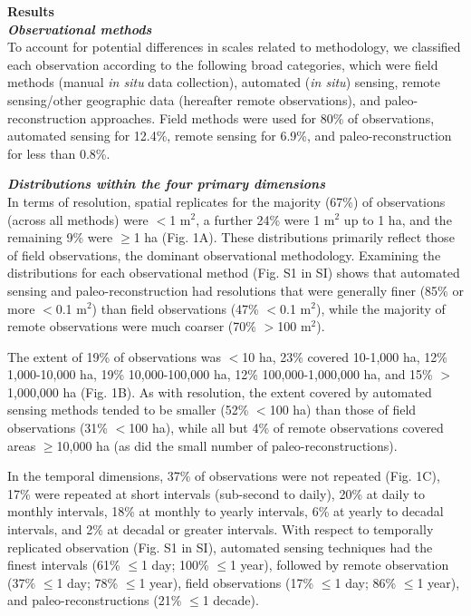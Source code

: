 \documentclass[12pt]{article}
\begin{document}
\noindent \textbf{Results}\\
\noindent \textbf{\emph{Observational methods}}\\
To account for potential differences in scales related to methodology, we classified each observation according to the following broad categories, which were field methods (manual \emph{in situ} data collection), automated (\emph{in situ}) sensing, remote sensing/other geographic data (hereafter remote observations), and paleo-reconstruction approaches. Field methods were used for 80\% of observations, automated sensing for 12.4\%, remote sensing for 6.9\%, and paleo-reconstruction for less than 0.8\%. 

\noindent \textbf{\emph{Distributions within the four primary dimensions}}\\
In terms of resolution, spatial replicates for the majority (67\%) of observations (across all methods) were $<$1 m$^2$, a further 24\% were 1 m$^2$ up to 1 ha, and the remaining 9\% were $\geq$1 ha (Fig. 1A). These distributions primarily reflect those of field observations, the dominant observational methodology. Examining the distributions for each observational method (Fig. S1 in SI) shows that automated sensing and paleo-reconstruction had resolutions that were generally finer (85\% or more $<$0.1 m$^2$) than field observations (47\% $<$0.1 m$^2$), while the majority of remote observations were much coarser (70\% $>$100 m$^2$).   

The extent of 19\% of observations was $<$10 ha, 23\% covered 10-1,000 ha, 12\% 1,000-10,000 ha, 19\% 10,000-100,000 ha, 12\% 100,000-1,000,000 ha, and 15\% $>$1,000,000 ha (Fig. 1B).  As with resolution, the extent covered by automated sensing methods tended to be smaller (52\% $<$100 ha) than those of field observations (31\% $<$100 ha), while all but 4\% of remote observations covered areas $\geq$10,000 ha (as did the small number of paleo-reconstructions).  


In the temporal dimensions, 37\% of observations were not repeated (Fig. 1C), 17\% were repeated at short intervals (sub-second to daily), 20\% at daily to monthly intervals, 18\% at monthly to yearly intervals, 6\% at yearly to decadal intervals, and 2\% at decadal or greater intervals. With respect to temporally replicated observation (Fig. S1 in SI), automated sensing techniques had the finest intervals (61\% $\leq$1 day; 100\% $\leq$1 year), followed by remote observation (37\% $\leq$1 day; 78\% $\leq$1 year), field observations (17\% $\leq$1 day; 86\% $\leq$1 year), and paleo-reconstructions (21\% $\leq$1 decade).   
\end{document}
